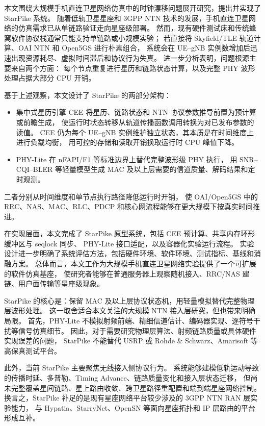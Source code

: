


本文围绕大规模手机直连卫星网络仿真中的时钟漂移问题展开研究，提出并实现了 StarPike 系统。
随着低轨卫星星座和 3GPP NTN 技术的发展，手机直连卫星网络的仿真需求已从单链路验证走向星座级部署。
然而，现有硬件测试床和传统蜂窝软件协议栈通常只能支持单链路或小规模实验；
若直接将 Skyfield/TLE 轨道计算、OAI NTN 和 Open5GS 进行朴素组合，
系统会在 UE--gNB 实例数增加后迅速出现资源耗尽、虚拟时间滞后和协议行为失真。
进一步分析表明，问题根源主要来自两个方面：
每个节点重复进行星历和链路状态计算，以及完整 PHY 波形处理占据大部分 CPU 开销。

基于上述观察，本文设计了 StarPike 的两部分架构：
\begin{itemize}
    \item 集中式星历引擎 CEE 将星历、链路状态和 NTN 协议参数推导前置为预计算或前瞻生成，
    使运行时状态转移从轨道传播函数调用转换为对已发布参数的读值。
    CEE 仍为每个 UE--gNB 实例维护独立状态，其本质是在时间维度上进行负载均衡，
    用可控的存储和读取开销换取运行时 CPU 峰值下降。
    \item PHY-Lite 在 nFAPI/F1 等标准边界上替代完整波形级 PHY 执行，
    用 SNR--CQI--BLER 等轻量模型生成 MAC 及以上层需要的信道质量、解码结果和定时观测。
\end{itemize}

二者分别从时间维度和单节点执行路径降低运行时开销，
使 OAI/Open5GS 中的 RRC、NAS、MAC、RLC、PDCP 和核心网流程能够在更大规模下按真实时间推进。

在实现层面，本文完成了 StarPike 原型系统，包括 CEE 预计算、共享内存环形缓冲区与 seqlock 同步、
PHY-Lite 接口适配，以及容器化实验运行流程。
实验设计进一步明确了系统评估方法，包括硬件环境、软件环境、测试指标、基线和消融方案。
总体而言，本文工作为大规模手机直连卫星网络实验提供了一个可扩展的软件仿真基座，
使研究者能够在普通服务器上观察随机接入、RRC/NAS 建链、用户面传输等星座级现象。


StarPike 的核心是：保留 MAC 及以上层协议状态机，用轻量模拟替代完整物理层波形处理。
这一取舍适合本文关注的大规模 NTN 接入层研究，但也带来明确局限。
首先，PHY-Lite 不模拟射频前端、精细信道估计、编码器实现、逐符号干扰等信号仿真细节。
因此，对于需要研究物理层算法、射频链路质量或具体硬件实现误差的问题，
StarPike 不能替代 USRP 或 Rohde \& Schwarz、Amarisoft 等高保真测试平台。

此外，当前 StarPike 主要聚焦无线接入侧协议行为。
系统能够建模低轨运动导致的传播时延、多普勒、Timing Advance、链路质量变化和接入层状态迁移，
但尚未完整覆盖星间链路、星上路由收敛、跨卫星路径重配置和端到端星座网络控制。
换言之，StarPike 补足的是现有星座网络平台较少涉及的 3GPP NTN RAN 层实验能力，
与 Hypatia、StarryNet、OpenSN 等面向星座拓扑和 IP 层路由的平台形成互补。

